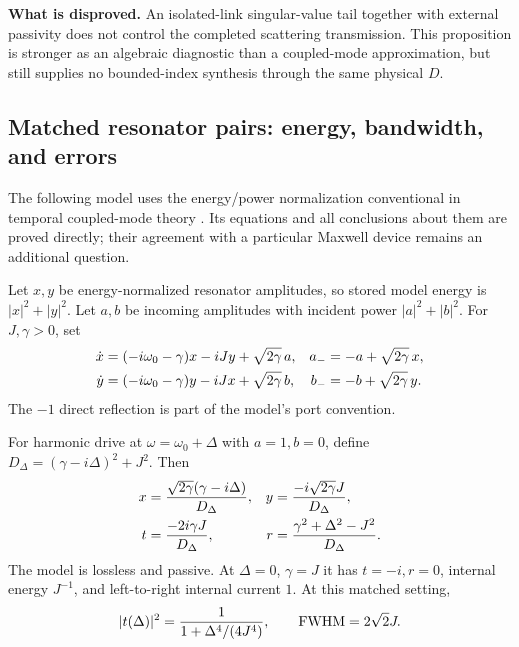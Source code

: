 \noindent\textbf{What is disproved.}
An isolated-link singular-value tail together with external passivity
does not control the completed scattering transmission. This proposition
is stronger as an algebraic diagnostic than a coupled-mode approximation,
but still supplies no bounded-index synthesis through the same physical $D$.

\subsection{Matched resonator pairs: energy, bandwidth, and errors}

The following model uses the energy/power normalization conventional in
temporal coupled-mode theory \cite{fan2003,suh2004}. Its equations and all
conclusions about them are proved directly; their agreement with a
particular Maxwell device remains an additional question.

\begin{definition}
\label{cx:pair-model}
Let $x,y$ be energy-normalized resonator amplitudes, so stored model energy
is $|x|^2+|y|^2$. Let $a,b$ be incoming amplitudes with incident power
$|a|^2+|b|^2$. For $J,\gamma>0$, set
\begin{align}
 \dot x&=(-i\omega_0-\gamma)x-iJy+\sqrt{2\gamma}\,a,
 &a_-&=-a+\sqrt{2\gamma}\,x,\notag\\
 \dot y&=(-i\omega_0-\gamma)y-iJx+\sqrt{2\gamma}\,b,
 &b_-&=-b+\sqrt{2\gamma}\,y.
 \label{cx:pair-dynamics}
\end{align}
The $-1$ direct reflection is part of the model's port convention.
\end{definition}

\begin{proposition}
\label{cx:pair-solution}
For harmonic drive at $\omega=\omega_0+\Delta$ with $a=1,b=0$, define
$D_\Delta=(\gamma-i\Delta)^2+J^2$. Then
\begin{align}
 x&=\frac{\sqrt{2\gamma}(\gamma-i\Delta)}{D_\Delta},&
 y&=\frac{-i\sqrt{2\gamma}J}{D_\Delta},\notag\\
 t&=\frac{-2i\gamma J}{D_\Delta},&
 r&=\frac{\gamma^2+\Delta^2-J^2}{D_\Delta}.
 \label{cx:pair-scattering}
\end{align}
The model is lossless and passive. At $\Delta=0$, $\gamma=J$ it has
$t=-i,r=0$, internal energy $J^{-1}$, and left-to-right internal current
$1$. At this matched setting,
\begin{equation}
 |t(\Delta)|^2=\frac1{1+\Delta^4/(4J^4)},\qquad
 {\rm FWHM}=2\sqrt2 J.
 \label{cx:matched-linewidth}
\end{equation}
\end{proposition}

